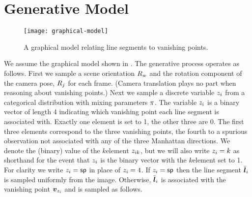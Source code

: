 
\section{Generative Model}

\begin{figure}[tb]
  \centering
  \texttt{[image: graphical-model]}
  \caption{A graphical model relating line segments to vanishing
    points.}
  \label{fig:R-graphical}
\end{figure}

\begin{figure}[tb]
  \centering
  \qquad
  \caption{}
  \label{fig:line-model}
\end{figure}

We assume the graphical model shown in . The
generative process operates as follows. First we sample a scene
orientation $\SceneR$ and the rotation component of the camera pose,
$\CamR_j$ for each frame. (Camera translation plays no part when
reasoning about vanishing points.) Next we sample a discrete variable
$\Indicator_i$ from a categorical distribution with mixing parameters
$\Mixing$. The variable $\Indicator_i$ is a binary vector of length 4
indicating which vanishing point each line segment is associated
with. Exactly one element is set to 1, the other three are 0. The
first three elements correspond to the three vanishing points, the
fourth to a spurious observation not associated
with any of the three Manhattan directions. We denote the (binary)
value of the $k$\th element $\Indicator_{ik}$, but we will also write
$\Indicator_i=k$ as shorthand for the event that $\Indicator_i$ is the
binary vector with the $k$\th element set to 1. For clarity we write
$\Indicator_i=\Spurious$ in place of $\Indicator_i=4$. If
$\Indicator_i=\Spurious$ then the line segment $\TrueSeg_i$ is
sampled uniformly from the image. Otherwise, $\TrueSeg_i$ is
associated with the vanishing point $\vpt_{\Indicator_i}$ and is
sampled as follows.

